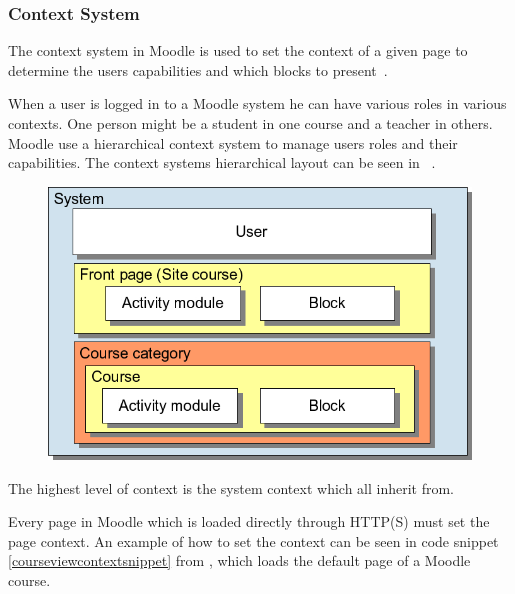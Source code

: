 \subsubsection{Context System}

The context system in Moodle is used to set the context of a given page to determine the users capabilities and which blocks to present~\cite{moodlerolesandmodules}.
 
When a user is logged in to a Moodle system he can have various roles in various contexts. 
One person might be a student in one course and a teacher in others. 
Moodle use a hierarchical context system to manage users roles and their capabilities. 
The context systems hierarchical layout can be seen in ~\cite{moodlefilemoodlecontext}.
 
 \begin{figure}
	 \centering
		 \includegraphics[width=\textwidth]{images/moodle-contexts.png}
	 \label{fig:moodle-contexts}
 \end{figure}

The highest level of context is the system context which all inherit from. 

Every page in Moodle which is loaded directly through HTTP(S) must set the page context. 
An example of how to set the context can be seen in code snippet \ref{courseviewcontextsnippet} from , which loads the default page of a Moodle course.

